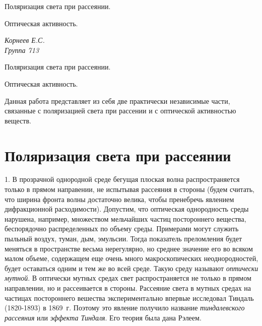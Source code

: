 \documentclass[14pt]{article}
\begin{document}
\begin{titlepage}
	\begin{center}
		\vspace*{6cm}
		\fontsize{24pt}{25pt}\selectfont
		Поляризация света при рассеянии.
		
		Оптическая активность.
	\end{center}
	\begin{flushright}
		\fontsize{18pt}{20pt}\selectfont
		\vspace{12cm}
		\hspace{-3cm}
		\textit{Корнеев Е.С.\\Группа 713}
	\end{flushright}		
\end{titlepage}

\begin{center}
	\fontsize{16pt}{18pt}\selectfont
	Поляризация света при рассеянии.
		
	Оптическая активность.
\end{center}

\fontsize{14pt}{16pt}\selectfont
Данная работа представляет из себя две практически независимые части, связанные с поляризацией света при рассении и с оптической активностью веществ.

\section{Поляризация света при рассеянии}

1. В прозрачной однородной среде бегущая плоская волна распространяется только в прямом направении, не испытывая рассеяния в стороны (будем считать, что ширина фронта волны достаточно велика, чтобы пренебречь явлением дифракционной расходимости). Допустим, что оптическая однородность среды нарушена, например, множеством мельчайших частиц постороннего вещества, беспорядочно распределенных по объему среды. Примерами могут служить пыльный воздух, туман, дым, эмульсии. Тогда показатель преломления будет меняться в пространстве весьма нерегулярно, но среднее значение его во всяком малом объеме, содержащем еще очень много макроскопических неоднородностей, будет оставаться одним и тем же во всей среде. Такую среду называют \textsl{оптически мутной}. В оптически мутных средах свет распространяется не только в прямом направлении, но и рассеивается в стороны. Рассеяние света в мутных средах на частицах постороннего вешества экспериментально впервые исследовал Тиндаль (1820-1893) в 1869~г. Поэтому это явление получило название \textsl{тиндалевского рассеяния} или \textsl{эффекта Тиндаля}. Его теория была дана Рэлеем.
\end{document}
